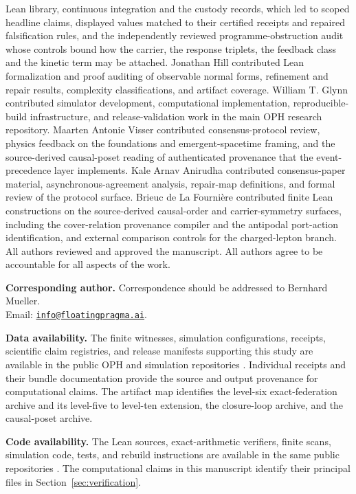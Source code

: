 \documentclass[11pt]{article}
\theoremstyle{definition}
\theoremstyle{remark}
\begin{document}
Lean library, continuous integration and the custody records, which led to
scoped headline claims, displayed values matched to their certified receipts
and repaired falsification rules, and the independently reviewed
programme-obstruction audit whose controls bound how the carrier, the
response triplets, the feedback class and the kinetic term may be attached. Jonathan Hill
contributed Lean formalization and proof auditing of observable normal forms,
refinement and repair results, complexity classifications, and artifact
coverage. William T. Glynn contributed simulator development, computational
implementation, reproducible-build infrastructure, and release-validation
work in the main OPH research repository. Maarten Antonie Visser contributed
consensus-protocol review, physics feedback on the foundations and
emergent-spacetime framing, and the source-derived causal-poset reading of
authenticated provenance that the event-precedence layer implements. Kale Arnav Anirudha contributed consensus-paper
material, asynchronous-agreement analysis, repair-map definitions, and formal
review of the protocol surface. Brieuc de La Fourni\`ere contributed finite
Lean constructions on the source-derived causal-order and carrier-symmetry
surfaces, including the cover-relation provenance compiler and the antipodal
port-action identification, and external comparison controls for the
charged-lepton branch.
All authors reviewed and approved
the manuscript. All authors agree to be accountable for all aspects of the
work.

\noindent\textbf{Corresponding author.}
Correspondence should be addressed to Bernhard Mueller.\\
Email:
\href{mailto:info@floatingpragma.ai}{\nolinkurl{info@floatingpragma.ai}}.

\noindent\textbf{Data availability.}
The finite witnesses, simulation configurations, receipts, scientific claim registries, and
release manifests supporting this study are available in the public OPH and
simulation repositories \cite{ophrepo,ophsim}. Individual receipts and their
bundle documentation provide the source and output provenance for
computational claims. The artifact map identifies the level-six
exact-federation archive and its level-five to level-ten extension, the
closure-loop archive, and the causal-poset archive.

\noindent\textbf{Code availability.}
The Lean sources, exact-arithmetic verifiers, finite scans, simulation code,
tests, and rebuild instructions are available in the same public repositories
\cite{ophrepo,ophsim}. The computational claims in this manuscript identify
their principal files in Section~\ref{sec:verification}.
\end{document}

